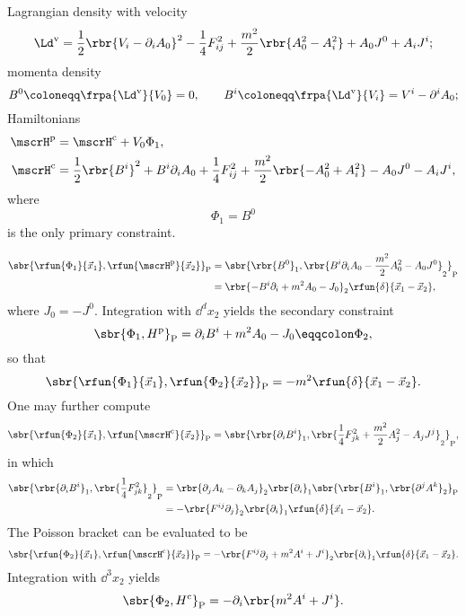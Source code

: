 \documentclass[a4paper,11pt]{article}
\begin{document}
Lagrangian density with velocity
\begin{equation}
\Ld^\text{v} = \frac{1}{2} \rbr{V_i - \partial_i A_0}^2 - \frac{1}{4} F_{ij}^2 
+ \frac{m^2}{2} \rbr{A_0^2 - A_i^2} + A_0 J^0 + A_i J^i;
\end{equation}
momenta density
\begin{equation}
B^0 \coloneqq \frpa{\Ld^\text{v}}{V_0} = 0,\qquad
B^i \coloneqq \frpa{\Ld^\text{v}}{V_i} = V^i - \partial^i A_0;
\end{equation}
Hamiltonians
\begin{align}
\mscrH^\text{p} &= \mscrH^\text{c} + V_0 \Phi_1,\\
\mscrH^\text{c} &= \frac{1}{2} \rbr{B^i}^2 + B^i \partial_i A_0 + \frac{1}{4} 
F_{ij}^2 + \frac{m^2}{2} \rbr{-A_0^2 + A_i^2} - A_0 J^0 - A_i J^i,\\
\end{align}
where
\begin{equation}
\Phi_1 = B^0
\end{equation}
is the only primary constraint.


\begin{align}
\sbr{\rfun{\Phi_1}{\vec{x}_1},\rfun{\mscrH^\text{p}}{\vec{x}_2}}_\text{P} &=
\sbr{\rbr{B^0}_1,\rbr{B^i\partial_i A_0-\frac{m^2}{2}A_0^2-A_0 J^0}_2}_\text{P}
\nonumber \\
&= \rbr{-B^i\partial_i + m^2 A_0 - J_0}_2 
\rfun{\delta}{\vec{x}_1-\vec{x}_2},
\end{align}
where $J_0 = -J^0$. Integration with $\dd^d x_2$ yields the secondary constraint
\begin{equation}
\sbr{\Phi_1, H^\text{p}}_\text{P} = \partial_i B^i + m^2 A_0 - J_0 
\eqqcolon \Phi_2,
\end{equation}
so that
\begin{equation}
\sbr{\rfun{\Phi_1}{\vec{x}_1},\rfun{\Phi_2}{\vec{x}_2}}_\text{P} = 
-m^2\rfun{\delta}{\vec{x}_1-\vec{x}_2}.
\label{eq:Maxwell-Proca-Q}
\end{equation}
One may further compute
\begin{equation}
\sbr{\rfun{\Phi_2}{\vec{x}_1}, \rfun{\mscrH^\text{c}}{\vec{x}_2}}_\text{P} = 
\sbr{\rbr{\partial_i B^i}_1,
\rbr{\frac{1}{4} F_{jk}^2 + \frac{m^2}{2} A_j^2 - A_j J^j}_2}_\text{P},
\end{equation}
in which
\begin{align}
\sbr{\rbr{\partial_i B^i}_1, \rbr{\frac{1}{4} F_{jk}^2}_2}_\text{P} &=
\rbr{\partial_j A_k - \partial_k A_j}_2 \rbr{\partial_i}_1
\sbr{\rbr{B^i}_1, \rbr{\partial^j A^k}_2}_\text{P} \nonumber \\
&= -\rbr{F^{ij} \partial_j}_2 \rbr{\partial_i}_1
\rfun{\delta}{\vec{x}_1-\vec{x}_2}.
\end{align}
The Poisson bracket can be evaluated to be
\begin{equation}
\sbr{\rfun{\Phi_2}{\vec{x}_1}, \rfun{\mscrH^\text{c}}{\vec{x}_2}}_\text{P} =
-\rbr{F^{ij} \partial_j + m^2 A^i + J^i}_2 \rbr{\partial_i}_1 
\rfun{\delta}{\vec{x}_1-\vec{x}_2}.
\end{equation}
Integration with $\dd^3 x_2$ yields
\begin{equation}
\sbr{\Phi_2, H^\text{c}}_\text{P} = -\partial_i\rbr{m^2 A^i + J^i}.
\end{equation}
\end{document}
